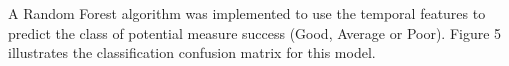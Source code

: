 A Random Forest algorithm was implemented to use the temporal features to predict the class of potential measure success (Good, Average or Poor). Figure 5 illustrates the classification confusion matrix for this model. 